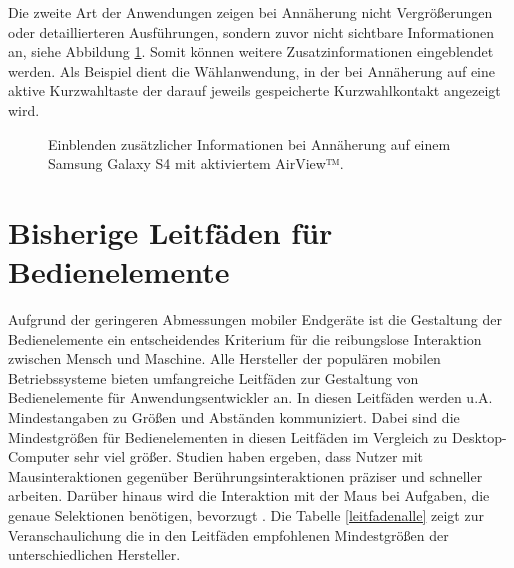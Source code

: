 \documentclass[a4paper,12pt,bibliography=totoc]{scrreprt}%
\begin{document}
Die zweite Art der Anwendungen zeigen bei Annäherung nicht Vergrößerungen oder detaillierteren Ausführungen, sondern zuvor nicht sichtbare Informationen an, siehe Abbildung \ref{samsungeinleitung2}. Somit können weitere Zusatzinformationen eingeblendet werden. Als Beispiel dient die Wählanwendung, in der bei Annäherung auf eine aktive Kurzwahltaste der darauf jeweils gespeicherte Kurzwahlkontakt angezeigt wird.

\begin{figure}
\hfill
{}
\caption{Einblenden zusätzlicher Informationen bei Annäherung auf einem Samsung Galaxy S4 mit aktiviertem AirView™.}
\label{samsungeinleitung2}
\end{figure}

\section{Bisherige Leitfäden für Bedienelemente}
Aufgrund der geringeren Abmessungen mobiler Endgeräte ist die Gestaltung der Bedienelemente ein entscheidendes Kriterium für die reibungslose Interaktion zwischen Mensch und Maschine. Alle Hersteller der populären mobilen Betriebssysteme bieten umfangreiche Leitfäden zur Gestaltung von Bedienelemente für Anwendungsentwickler an.
In diesen Leitfäden werden u.A. Mindestangaben zu Größen und Abständen kommuniziert. Dabei sind die Mindestgrößen für Bedienelementen in diesen Leitfäden im Vergleich zu Desktop-Computer sehr viel größer. Studien haben ergeben, dass Nutzer mit Mausinteraktionen gegenüber Berührungsinteraktionen präziser und schneller arbeiten. Darüber hinaus wird die Interaktion mit der Maus bei Aufgaben, die genaue Selektionen benötigen, bevorzugt \citep{touchmouse}. 
Die Tabelle \ref{leitfadenalle} zeigt zur Veranschaulichung die in den Leitfäden empfohlenen Mindestgrößen der unterschiedlichen Hersteller.
\end{document}

